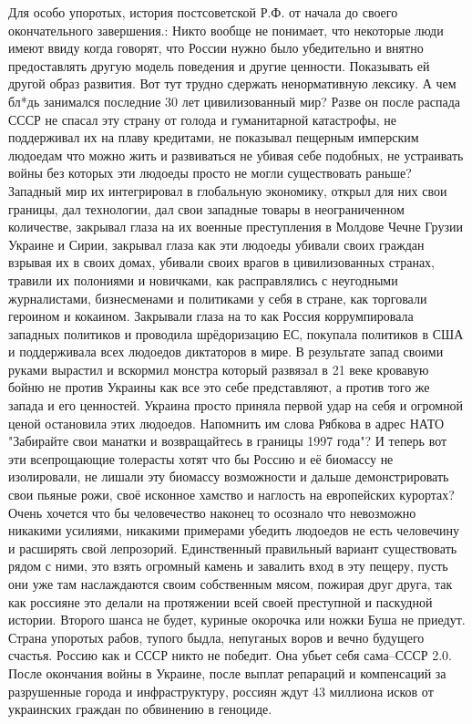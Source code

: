 Для особо упоротых, история постсоветской Р.Ф. от начала до своего
окончательного завершения.: Никто вообще не понимает, что некоторые люди имеют
ввиду когда говорят, что России нужно было убедительно и внятно предоставлять
другую модель поведения и другие ценности. Показывать ей другой образ развития.
Вот тут трудно сдержать ненормативную лексику. А чем бл*дь занимался последние
30 лет цивилизованный мир? Разве он после распада СССР не спасал эту страну от
голода и гуманитарной катастрофы, не поддерживал их на плаву кредитами, не
показывал пещерным имперским людоедам что можно жить и развиваться не убивая
себе подобных, не устраивать войны без которых эти людоеды просто не могли
существовать раньше? Западный мир их интегрировал в глобальную экономику,
открыл для них свои границы, дал технологии, дал свои западные товары в
неограниченном количестве, закрывал глаза на их военные преступления в Молдове
Чечне Грузии Украине и Сирии, закрывал глаза как эти людоеды убивали своих
граждан взрывая их в своих домах, убивали своих врагов в цивилизованных
странах, травили их полониями и новичками, как расправлялись с неугодными
журналистами, бизнесменами и политиками у себя в стране, как торговали героином
и кокаином. Закрывали глаза на то как Россия коррумпировала западных политиков
и проводила шрёдоризацию ЕС, покупала политиков в США и поддерживала всех
людоедов диктаторов в мире. В результате запад своими руками вырастил и
вскормил монстра который развязал в 21 веке кровавую бойню не против Украины
как все это себе представляют, а против того же запада и его ценностей. Украина
просто приняла первой удар на себя и огромной ценой остановила этих людоедов.
Напомнить им слова Рябкова в адрес НАТО "Забирайте свои манатки и возвращайтесь
в границы 1997 года"? И теперь вот эти всепрощающие толерасты хотят что бы
Россию и её биомассу не изолировали, не лишали эту биомассу возможности и
дальше демонстрировать свои пьяные рожи, своё исконное хамство и наглость на
европейских курортах? Очень хочется что бы человечество наконец то осознало что
невозможно никакими усилиями, никакими примерами убедить людоедов не есть
человечину и расширять свой лепрозорий. Единственный правильный вариант
существовать рядом с ними, это взять огромный камень и завалить вход в эту
пещеру, пусть они уже там наслаждаются своим собственным мясом, пожирая друг
друга, так как россияне это делали на протяжении всей своей преступной и
паскудной истории. Второго шанса не будет, куриные окорочка или ножки Буша не
приедут. Страна упоротых рабов, тупого быдла, непуганых воров и вечно будущего
счастья. Россию как и СССР никто не победит. Она убьет себя сама--СССР 2.0.
После окончания войны в Украине, после выплат репараций и компенсаций за
разрушенные города и инфраструктуру, россиян ждут 43 миллиона исков от
украинских граждан по обвинению в геноциде.

